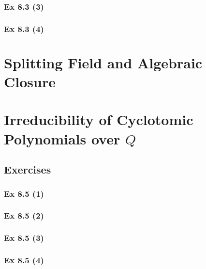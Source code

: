 \subsubsection{Ex 8.3 (3)}\label{sec:Ex_8.3.3}

\subsubsection{Ex 8.3 (4)}\label{sec:Ex_8.3.4}

\newpage		%

\section{Splitting Field and Algebraic Closure}\label{sec:8.4}

\newpage		%

\section{Irreducibility of Cyclotomic Polynomials over $Q$}\label{sec:8.5}
\subsection{Exercises}\label{sec:8.5_Exercises}

\subsubsection{Ex 8.5 (1)}\label{sec:Ex_8.5.1}

\subsubsection{Ex 8.5 (2)}\label{sec:Ex_8.5.2}

\subsubsection{Ex 8.5 (3)}\label{sec:Ex_8.5.3}

\subsubsection{Ex 8.5 (4)}\label{sec:Ex_8.5.4}

